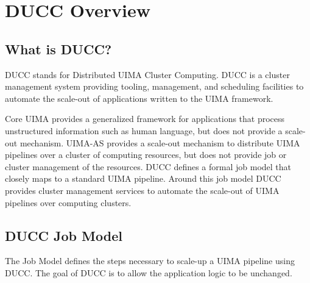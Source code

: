 % 
% 
% 
% 
\ifpdf
\else
{}
\fi
\chapter{DUCC Overview}

    \section{What is DUCC?}

    DUCC stands for Distributed UIMA Cluster Computing. DUCC is a cluster management system
    providing tooling, management, and scheduling facilities to automate the scale-out of
    applications written to the UIMA framework.

    Core UIMA provides a generalized framework for applications that process unstructured
    information such as human language, but does not provide a scale-out mechanism. UIMA-AS provides
    a scale-out mechanism to distribute UIMA pipelines over a cluster of computing resources, but
    does not provide job or cluster management of the resources. DUCC defines a formal job model
    that closely maps to a standard UIMA pipeline. Around this job model DUCC provides cluster
    management services to automate the scale-out of UIMA pipelines over computing clusters.

    \section{DUCC Job Model}

    The Job Model defines the steps necessary to scale-up a UIMA pipeline using DUCC.  The goal of
    DUCC is to allow the application logic to be unchanged.

